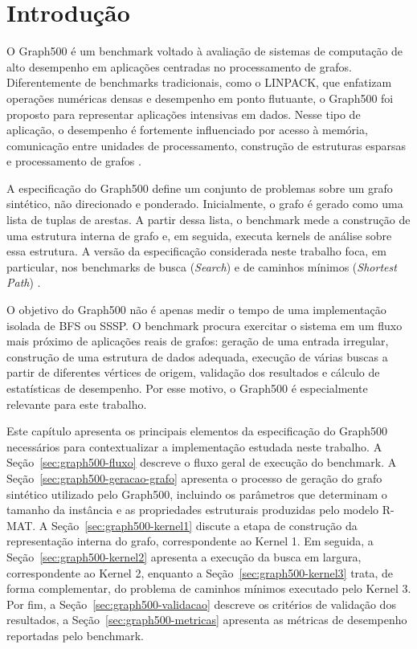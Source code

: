 \section{Introdução}
\label{sec:graph500-intro}

O Graph500 é um benchmark voltado à avaliação de sistemas 
de computação de alto desempenho em aplicações centradas no processamento de grafos. 
Diferentemente de benchmarks tradicionais, como o LINPACK, que enfatizam operações 
numéricas densas e desempenho em ponto flutuante, 
o Graph500 foi proposto para representar aplicações intensivas em dados. 
Nesse tipo de aplicação, o desempenho é fortemente influenciado por acesso à memória, 
comunicação entre unidades de processamento, construção de estruturas esparsas e processamento de grafos \cite{murphygraph500, graph500spec}.

A especificação do Graph500 define um conjunto de problemas sobre um grafo sintético, 
não direcionado e ponderado. Inicialmente, o grafo é gerado como uma lista de tuplas de arestas. 
A partir dessa lista, o benchmark mede a construção de uma estrutura interna de grafo e, 
em seguida, executa kernels de análise sobre essa estrutura. 
A versão da especificação considerada neste trabalho foca, em particular, 
nos benchmarks de busca (\textit{Search}) e de caminhos mínimos (\textit{Shortest Path}) \cite{graph500spec}.

O objetivo do Graph500 não é apenas medir o tempo de uma implementação isolada 
de BFS ou SSSP. O benchmark procura exercitar o sistema em um fluxo mais próximo
 de aplicações reais de grafos: geração de uma entrada irregular, construção de uma estrutura de dados adequada, 
 execução de várias buscas a partir de diferentes vértices de origem, validação dos resultados
  e cálculo de estatísticas de desempenho. Por esse motivo, o Graph500 é especialmente relevante para este trabalho.

Este capítulo apresenta os principais elementos da especificação do Graph500 necessários para contextualizar 
a implementação estudada neste trabalho. A Seção~\ref{sec:graph500-fluxo} descreve o fluxo geral de execução do benchmark. 
A Seção~\ref{sec:graph500-geracao-grafo} apresenta o processo de geração do grafo sintético utilizado pelo Graph500, incluindo os parâmetros que determinam o tamanho da instância e as propriedades estruturais produzidas pelo modelo R-MAT. 
A Seção~\ref{sec:graph500-kernel1} discute a etapa de construção da representação interna do grafo, correspondente ao Kernel 1. 
Em seguida, a Seção~\ref{sec:graph500-kernel2} apresenta a execução da busca em largura, correspondente ao Kernel 2, 
enquanto a Seção~\ref{sec:graph500-kernel3} trata, de forma complementar, do problema de caminhos mínimos executado pelo Kernel 3. 
Por fim, a Seção~\ref{sec:graph500-validacao} descreve os critérios de validação dos resultados, 
a Seção~\ref{sec:graph500-metricas} apresenta as métricas de desempenho reportadas pelo benchmark.


